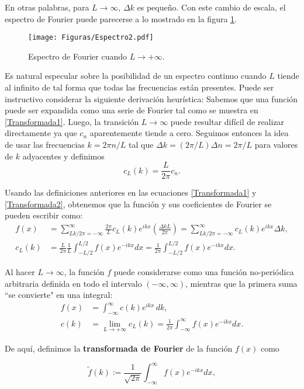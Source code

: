 En otras palabras, para $L \to \infty$, $\Delta k$ es pequeño. Con este cambio de escala, el espectro de Fourier puede parecerse a lo mostrado en la figura \ref{Espectro1}.

\begin{figure}
    \centering
    \texttt{[image: Figuras/Espectro2.pdf]}    \caption{Espectro de Fourier cuando $L \to + \infty$.}
    \label{Espectro1}
\end{figure}

Es natural especular sobre la posibilidad de un espectro continuo cuando $L$ tiende al infinito  de tal forma que todas las frecuencias están presentes. Puede ser instructivo considerar la siguiente derivación heurística: Sabemos que una función puede ser expandida como una serie de Fourier tal como se muestra en \eqref{Transformada1}. Luego, la transición $L \to \infty$ puede resultar difícil de realizar directamente ya que $c_n$ aparentemente tiende a cero. Seguimos entonces la idea de usar las frecuencias $k = 2\pi n/L$ tal que
$\Delta k = (2\pi/L ) \Delta n = 2\pi/L$ para valores de $k$ adyacentes y definimos
$$c_L(k) = \frac{L}{2 \pi} c_n.$$

Usando las definiciones anteriores en las ecuaciones \eqref{Transformada1} y \eqref{Transformada2}, obtenemos que la función y sus coeficientes de Fourier se pueden escribir como: 
\begin{align*}
    f(x)&= \sum_{Lk/2\pi = -\infty}^{\infty} \frac{2\pi}{L} c_L(k) e^{ikx} \left( \frac{\Delta k L}{2\pi}\right) = \sum_{Lk/2\pi = -\infty}^{\infty}  c_L(k) e^{ikx} \Delta k , \\
  c_L(k) &= \frac{L}{2\pi} \frac{1}{L} \int_{-L/2}^{L/2} f(x) e^{-ikx} dx = \frac{1}{2\pi} \int_{-L/2}^{L/2} f(x) e^{-ikx} dx.
\end{align*}

Al hacer $L \to \infty$, la función $f$ puede considerarse como una
función no-periódica arbitraria definida en todo el intervalo $(-\infty, \infty)$, mientras que la primera suma ``se convierte"  en una integral:
\begin{align*}
    f(x)&= \int_{-\infty}^{\infty} c(k) e^{ikx} \,dk, \\
  c(k) &= \lim_{L\to + \infty} c_L(k) =  \frac{1}{2\pi}  \int_{-\infty}^{\infty} f(x) e^{-ikx} dx.
\end{align*}

De aquí, definimos la \textbf{transformada de Fourier} de la función $f(x)$ como 
\begin{shaded}
  \begin{equation}
 \tilde{f}(k) := \frac{1}{\sqrt{2\pi}} \int_{-\infty}^{\infty} f(x) e^{-ikx} dx \label{T.Fourier} ,
\end{equation}  
\end{shaded}

